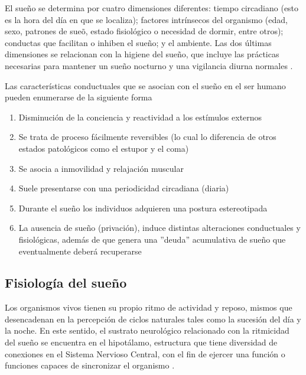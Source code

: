 El sue\~no se determina por cuatro dimensiones diferentes: tiempo circadiano (esto es la hora 
del d\'ia en que se localiza); factores intr\'insecos del organismo (edad, sexo, patrones de 
sue\~o, estado fisiol\'ogico o necesidad de dormir, entre otros); conductas que facilitan o 
inhiben el sue\~no; y el ambiente. Las dos \'ultimas dimensiones se relacionan con la higiene 
del sueño, que incluye las pr\'acticas necesarias para mantener un sue\~no nocturno y una 
vigilancia diurna normales \cite{Sierra02}.

Las caracter\'isticas conductuales que se asocian con el sue\~no en el ser humano pueden 
enumerarse de la siguiente forma\cite{CarrilloMora} 
\begin{enumerate}
\item Disminuci\'on de la conciencia y reactividad a los est\'imulos externos
\item Se trata de proceso f\'acilmente reversibles (lo cual lo diferencia de otros estados 
patol\'ogicos como el estupor y el coma)
\item Se asocia a inmovilidad y relajaci\'on muscular
\item Suele presentarse con una periodicidad circadiana (diaria)
\item Durante el sue\~no los individuos adquieren una postura estereotipada
\item La ausencia de sue\~no (privaci\'on), induce distintas alteraciones conductuales y 
fisiol\'ogicas, adem\'as de que genera una ''deuda'' acumulativa de sueño que eventualmente 
deber\'a recuperarse 
\end{enumerate}

\subsection{Fisiolog\'ia del sueño}


Los organismos vivos tienen su propio ritmo de actividad y reposo, mismos que desencadenan en la 
percepci\'on de ciclos naturales tales como la sucesión del d\'ia y la noche. En este sentido, 
el sustrato neurol\'ogico relacionado con la ritmicidad del sueño se encuentra en el hipot\'alamo, 
estructura que tiene diversidad de conexiones en el Sistema Nervioso Central, con el fin de 
ejercer una funci\'on o funciones capaces de sincronizar el organismo 
\cite{FernandezConde07,Cabrera14}.

